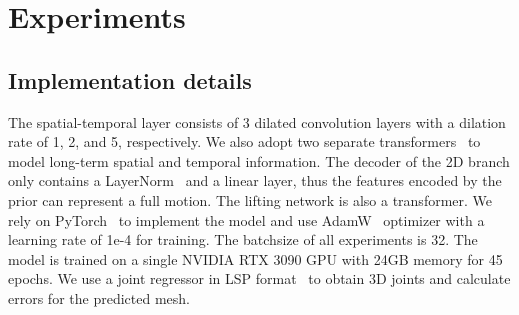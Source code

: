 \section{Experiments}
\label{sec:experiments}

\subsection{Implementation details}
The spatial-temporal layer consists of 3 dilated convolution layers with a dilation rate of 1, 2, and 5, respectively. We also adopt two separate transformers~\cite{dosovitskiy2020image} to model long-term spatial and temporal information. The decoder of the 2D branch only contains a LayerNorm~\cite{ba2016layer} and a linear layer, thus the features encoded by the prior can represent a full motion. The lifting network is also a transformer. We rely on PyTorch~\cite{paszke2019pytorch} to implement the model and use AdamW~\cite{loshchilov2017decoupled} optimizer with a learning rate of 1e-4 for training. The batchsize of all experiments is 32. The model is trained on a single NVIDIA RTX 3090 GPU with 24GB memory for 45 epochs. We use a joint regressor in LSP format~\cite{johnson2010clustered} to obtain 3D joints and calculate errors for the predicted mesh.

